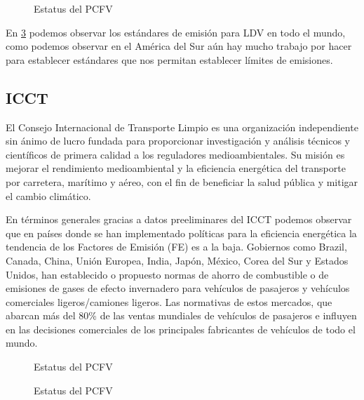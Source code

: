  \begin{figure}[htbp]
   \centering
   
    \caption{Estatus del PCFV \cite{Vehicles_PCFV}}
    \label{fig:statuslatam-PCFV}
\end{figure}

En \ref{fig:statuslatam-PCFV} podemos observar los estándares de emisión para LDV en todo el mundo, como podemos observar en el América del Sur aún hay mucho trabajo por hacer para establecer estándares que nos permitan establecer límites de emisiones.

\subsection{ICCT}

El Consejo Internacional de Transporte Limpio es una organización independiente sin ánimo de lucro fundada para proporcionar investigación y análisis técnicos y científicos de primera calidad a los reguladores medioambientales. Su misión es mejorar el rendimiento medioambiental y la eficiencia energética del transporte por carretera, marítimo y aéreo, con el fin de beneficiar la salud pública y mitigar el cambio climático.

En términos generales gracias a datos preeliminares del ICCT podemos observar que en países donde se han implementado políticas para la eficiencia energética la tendencia de los Factores de Emisión (FE) es a la baja. Gobiernos como Brazil, Canada, China, Unión Europea, India, Japón, México, Corea del Sur y Estados Unidos, han establecido o propuesto normas de ahorro de combustible o de emisiones de gases de efecto invernadero para vehículos de pasajeros y vehículos comerciales ligeros/camiones ligeros. Las normativas de estos mercados, que abarcan más del 80\% de las ventas mundiales de vehículos de pasajeros e influyen en las decisiones comerciales de los principales fabricantes de vehículos de todo el mundo.


 \begin{figure}[htbp]
   \centering
   
    \caption{Estatus del PCFV \cite{Vehicles_PCFV}}
    \label{fig:statuslatam-PCFV}
\end{figure}

 \begin{figure}[htbp]
   \centering
   
    \caption{Estatus del PCFV \cite{Vehicles_PCFV}}
    \label{fig:statuslatam-PCFV}
\end{figure}


